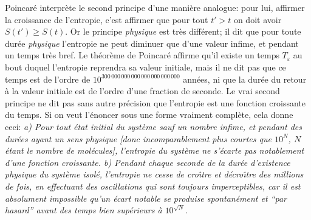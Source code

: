 \medskip
Poincar\'e interpr\`ete le second principe d'une mani\`ere analogue: pour 
lui, affirmer la croissance de l'entropie, c'est affirmer que pour tout 
$t' > t$ on doit avoir $S(t') \geq S(t)$. 
Or le principe {\it physique} est tr\`es diff\'erent; il dit que pour 
toute dur\'ee {\it physique} l'entropie ne peut diminuer que d'une valeur 
infime, et pendant un temps tr\`es bref. Le th\'eor\`eme de Poincar\'e 
affirme qu'il existe un temps $T_{\varepsilon}$ au bout duquel l'entropie 
reprendra sa valeur initiale, mais il ne dit pas que ce temps est 
de l'ordre de $10^{300\, 000\, 000\, 000\, 000\, 000\, 000\, 000}$ 
ann\'ees, ni que la dur\'ee du retour \`a la valeur initiale est de l'ordre 
d'une fraction de seconde. Le vrai second principe ne dit pas sans autre 
pr\'ecision que l'entropie est une fonction croissante du temps. Si on veut 
l'\'enoncer sous une forme vraiment compl\`ete, cela donne ceci: 
\medskip
{\sl a) Pour tout \'etat initial du syst\`eme sauf un nombre infime, et
pendant des dur\'ees ayant un sens physique [donc incomparablement plus 
courtes que $10^N$, $N$ \'etant le nombre de mol\'ecules], l'entropie du 
syst\`eme ne s'\'ecarte pas notablement d'une fonction croissante. 
\medskip
b) Pendant chaque seconde de la dur\'ee d'existence physique du 
syst\`eme isol\'e, l'entropie ne cesse de cro{\^\i}tre et d\'ecro{\^\i}tre 
des millions de fois, en effectuant des oscillations qui sont toujours 
imperceptibles, car il est absolument impossible qu'un \'ecart notable se 
produise spontan\'ement et ``{par hasard}'' avant des temps bien
sup\'erieurs \`a $10^{\sqrt{N}}$.  }

\bigskip

